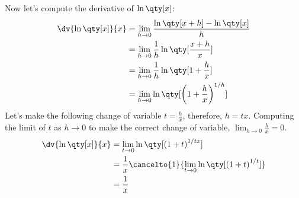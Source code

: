\documentclass[../main-notes.tex]{subfile}
\begin{document}
Now let's compute the derivative of $\ln\qty[x]$:
\begin{align*}
    \dv{\ln\qty[x]}{x} &= \lim_{h\to0}\frac{\ln\qty[x+h] - \ln\qty[x]}{h} \\
                       &= \lim_{h\to0}\frac{1}{h}\ln\qty[\frac{x+h}{x}] \\
                       &= \lim_{h\to0}\frac{1}{h}\ln\qty[1+\frac{h}{x}] \\
                       &= \lim_{h\to0}\ln\qty[\left(1+\frac{h}{x}\right)^{1/h}]
\end{align*}
Let's make the following change of variable \(t = \frac{h}{x}\), therefore, \(h = tx\).
Computing the limit of $t$ as $h\to0$ to make the correct change of variable, \(\lim_{h\to0}\frac{h}{x}=0\). 
\begin{align*}
    \dv{\ln\qty[x]}{x} &= \lim_{t\to0}\ln\qty[\left(1+t\right)^{1/tx}] \\
                       &= \frac{1}{x}\cancelto{1}{\lim_{t\to0}\ln\qty[\left(1+t\right)^{1/t}]} \\
                       &= \frac{1}{x}
\end{align*}
\end{document}

